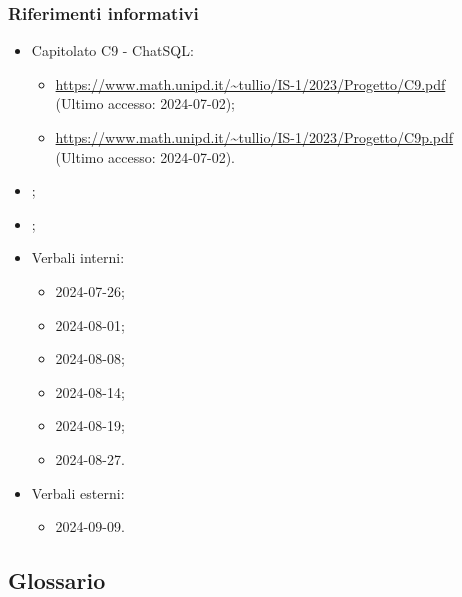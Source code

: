 \subsubsection{Riferimenti informativi}
\begin{itemize}
  \item Capitolato C9 - ChatSQL:
  \begin{itemize}
    \item \href{https://www.math.unipd.it/~tullio/IS-1/2023/Progetto/C9.pdf}{https://www.math.unipd.it/\textasciitilde tullio/IS-1/2023/Progetto/C9.pdf} \\ (Ultimo accesso: 2024-07-02);
    \item \href{https://www.math.unipd.it/~tullio/IS-1/2023/Progetto/C9p.pdf}{https://www.math.unipd.it/\textasciitilde tullio/IS-1/2023/Progetto/C9p.pdf} \\ (Ultimo accesso: 2024-07-02).
  \end{itemize}
  \item \AnalisiDeiRequisiti;
  \item \Glossario;
  \item Verbali interni:
  \begin{itemize}
    \item 2024-07-26;
    \item 2024-08-01;
    \item 2024-08-08;
    \item 2024-08-14;
    \item 2024-08-19;
    \item 2024-08-27.
  \end{itemize}
  \item Verbali esterni:
  \begin{itemize}
    \item 2024-09-09.
  \end{itemize}
\end{itemize}

\subsection{Glossario} 
\GlossarioIntroduzione

